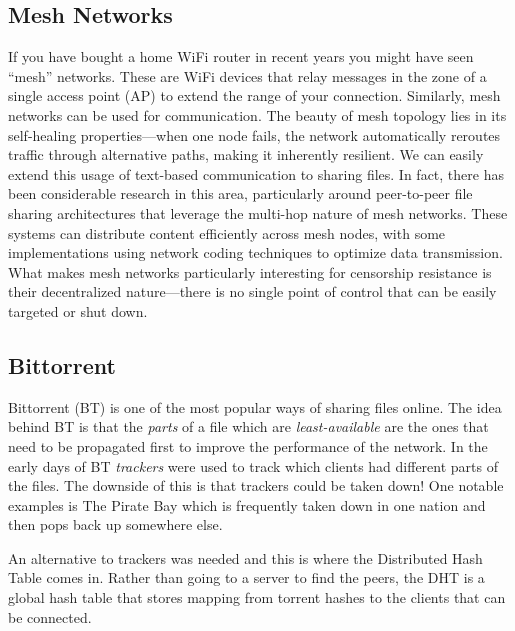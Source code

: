 \subsection{Mesh Networks}

If you have bought a home WiFi router in recent years you might have seen
``mesh'' networks. These are WiFi devices that relay messages in the zone of a
single access point (AP) to extend the range of your connection. Similarly, mesh
networks can be used for communication.
The beauty of mesh topology lies in
its self-healing properties---when one node fails, the network automatically
reroutes traffic through alternative paths, making it inherently resilient.
We can easily extend this usage of text-based communication to sharing files.
In fact, there has been considerable research in this area, particularly around
peer-to-peer file sharing architectures that leverage the multi-hop nature of
mesh networks.
These
systems can distribute content efficiently across mesh nodes, with some
implementations using network coding techniques to optimize data transmission.
What makes mesh networks
particularly interesting for censorship resistance is their decentralized
nature---there is no single point of control that can be easily targeted or shut
down.

\subsection{Bittorrent}
\label{bittorrent}

Bittorrent (BT) is one of the most popular ways of sharing files online. The
idea behind BT is that the \emph{parts} of a file which are
\emph{least-available} are the ones that need to be propagated first to improve the performance of the network. In the early days of BT \emph{trackers} were used to track which clients had different parts of the files. The downside of this is that trackers could be taken down! One notable examples is The Pirate Bay which is frequently taken down in one nation and then pops back up somewhere else.

An alternative to trackers was needed and this is where the Distributed Hash Table comes in. Rather than going to a server to find the peers, the DHT is a global hash table that stores mapping from torrent hashes to the clients that can be connected.


